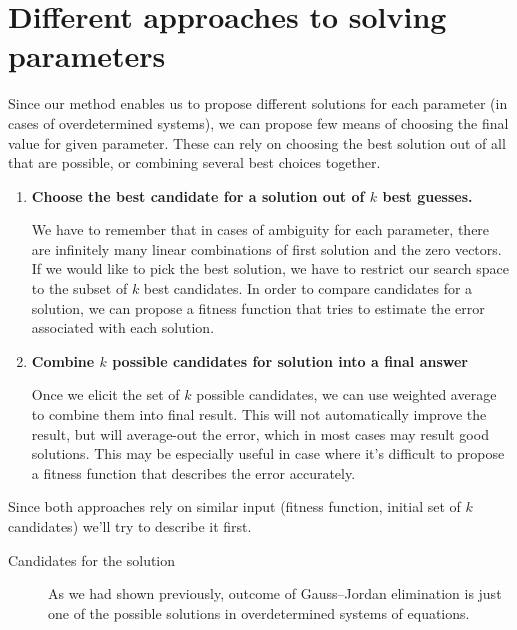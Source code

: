 \section{Different approaches to solving parameters}
Since our method enables us to propose different solutions for each parameter (in cases of overdetermined systems), we can propose few means of choosing the final value for given parameter.
These can rely on choosing the best solution out of all that are possible, or combining several best choices together.
\begin{enumerate}
    \item \textbf{Choose the best candidate for a solution out of $k$ best guesses.}

        We have to remember that in cases of ambiguity for each parameter, there are infinitely many linear combinations of first solution and the zero vectors.
        If we would like to pick the best solution, we have to restrict our search space to the subset of $k$ best candidates.
        In order to compare candidates for a solution, we can propose a fitness function that tries to estimate the error associated with each solution.
    \item \textbf{Combine $k$ possible candidates for solution into a final answer}
        
        Once we elicit the set of $k$ possible candidates, we can use weighted average to combine them into final result.
        This will not automatically improve the result, but will average-out the error, which in most cases may result good solutions.
        This may be especially useful in case where it's difficult to propose a fitness function that describes the error accurately.
\end{enumerate}
Since both approaches rely on similar input (fitness function, initial set of $k$ candidates) we'll try to describe it first.

\begin{description}
    \item[Candidates for the solution]

    As we had shown previously, outcome of Gauss--Jordan elimination is just one of the possible solutions in overdetermined systems of equations.
\end{description}

